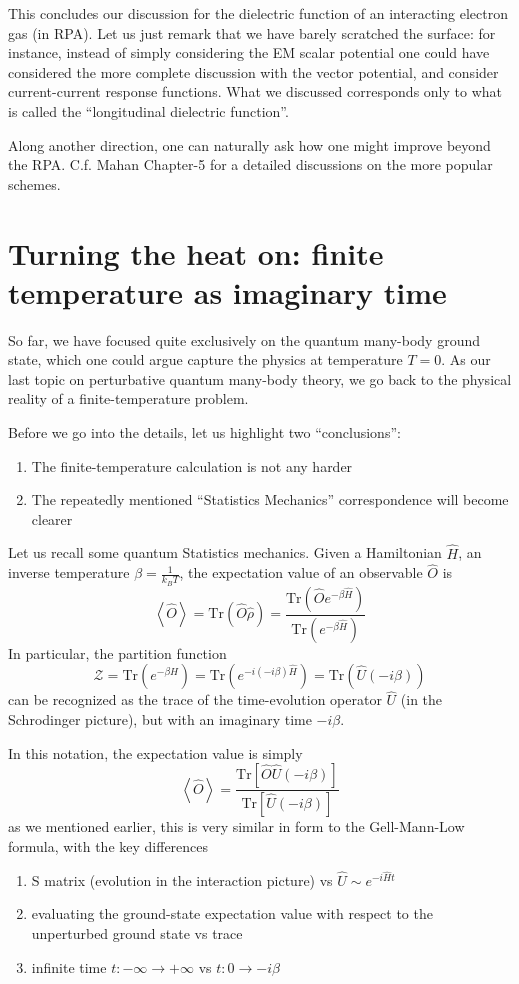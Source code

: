 This concludes our discussion for the dielectric function of an interacting electron gas (in RPA). Let us just remark that we have barely scratched the surface: for instance, instead of simply considering the EM scalar potential one could have considered the more complete discussion with the vector potential, and consider current-current response functions. What we discussed corresponds only to what is called the ``longitudinal dielectric function''.

Along another direction, one can naturally ask how one might improve beyond the RPA. C.f. Mahan Chapter-5 for a detailed discussions on the more popular schemes.

\section{Turning the heat on: finite temperature as imaginary time}

So far, we have focused quite exclusively on the quantum many-body ground state, which one could argue capture the physics at temperature $T=0$. As our last topic on perturbative quantum many-body theory, we go back to the physical reality of a finite-temperature problem.

Before we go into the details, let us highlight two ``conclusions'':
\begin{enumerate}
    \item The finite-temperature calculation is not any harder
    \item The repeatedly mentioned ``Statistics Mechanics'' correspondence will become clearer
\end{enumerate}

Let us recall some quantum Statistics mechanics. Given a Hamiltonian $\hat{H}$, an inverse temperature $\beta=\frac{1}{k_BT}$, the expectation value of an observable $\hat{O}$ is
\[ \left< \hat{O} \right> =\mathrm{Tr}\left( \hat{O}\hat{\rho} \right) =\frac{\mathrm{Tr}\left( \hat{O}e^{-\beta \hat{H}} \right)}{\mathrm{Tr}\left( e^{-\beta \hat{H}} \right)}\]
In particular, the partition function
\[ \mathcal{Z} =\mathrm{Tr}\left( e^{-\beta \hat{H}} \right) =\mathrm{Tr}\left( e^{-i\left( -i\beta \right) \hat{H}} \right) =\mathrm{Tr}\left( \hat{U}\left( -i\beta \right) \right) \]
can be recognized as the trace of the time-evolution operator $\hat{U}$ (in the Schrodinger picture), but with an imaginary time $-i\beta$.

In this notation, the expectation value is simply
\[ \left< \hat{O} \right> =\frac{\mathrm{Tr}\left[ \hat{O}\hat{U}\left( -i\beta \right) \right]}{\mathrm{Tr}\left[ \hat{U}\left( -i\beta \right) \right]}\]
as we mentioned earlier, this is very similar in form to the Gell-Mann-Low formula, with the key differences
\begin{enumerate}
    \item S matrix (evolution in the interaction picture) vs $\hat{U}\sim e^{-i\hat{H}t}$
    \item evaluating the ground-state expectation value with respect to the unperturbed ground state vs trace
    \item infinite time $t:-\infty\to +\infty$ vs $t:0\to -i\beta$
\end{enumerate}


